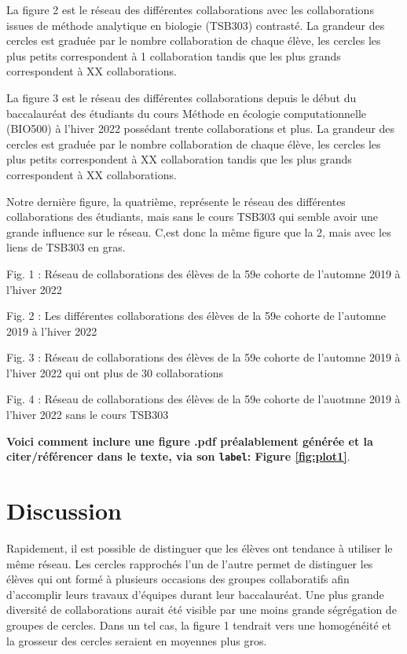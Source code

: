 \documentclass[9pt,twocolumn,twoside,]{pnas-new}
\begin{document}
La figure 2 est le réseau des différentes collaborations avec les
collaborations issues de méthode analytique en biologie (TSB303)
contrasté. La grandeur des cercles est graduée par le nombre
collaboration de chaque élève, les cercles les plus petits correspondent
à 1 collaboration tandis que les plus grands correspondent à XX
collaborations.

La figure 3 est le réseau des différentes collaborations depuis le début
du baccalauréat des étudiants du cours Méthode en écologie
computationnelle (BIO500) à l'hiver 2022 possédant trente collaborations
et plus. La grandeur des cercles est graduée par le nombre collaboration
de chaque élève, les cercles les plus petits correspondent à XX
collaboration tandis que les plus grands correspondent à XX
collaborations.

Notre dernière figure, la quatrième, représente le réseau des
différentes collaborations des étudiants, mais sans le cours TSB303 qui
semble avoir une grande influence sur le réseau. C,est donc la même
figure que la 2, mais avec les liens de TSB303 en gras.

Fig. 1 : Réseau de collaborations des élèves de la 59e cohorte de
l'automne 2019 à l'hiver 2022

Fig. 2 : Les différentes collaborations des élèves de la 59e cohorte de
l'automne 2019 à l'hiver 2022

Fig. 3 : Réseau de collaborations des élèves de la 59e cohorte de
l'automne 2019 à l'hiver 2022 qui ont plus de 30 collaborations

Fig. 4 : Réseau de collaborations des élèves de la 59e cohorte de
l'auotmne 2019 à l'hiver 2022 sans le cours TSB303

\textbf{Voici comment inclure une figure .pdf préalablement générée et
la citer/référencer dans le texte, via son \texttt{label}: Figure
\ref{fig:plot1}}.

\hypertarget{discussion}{%
\section{Discussion}\label{discussion}}

Rapidement, il est possible de distinguer que les élèves ont tendance à
utiliser le même réseau. Les cercles rapprochés l'un de l'autre permet
de distinguer les élèves qui ont formé à plusieurs occasions des groupes
collaboratifs afin d'accomplir leurs travaux d'équipes durant leur
baccalauréat. Une plus grande diversité de collaborations aurait été
visible par une moins grande ségrégation de groupes de cercles. Dans un
tel cas, la figure 1 tendrait vers une homogénéité et la grosseur des
cercles seraient en moyennes plus gros.
\end{document}
